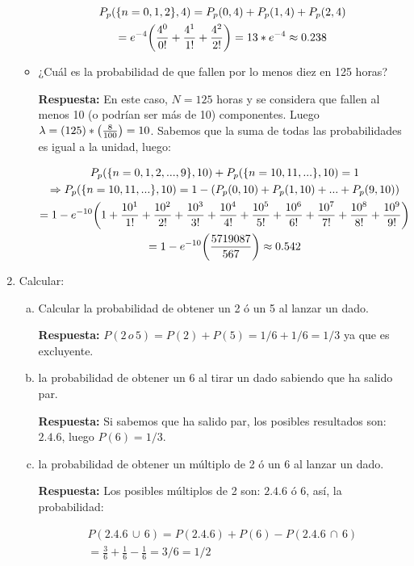 \documentclass[12pt]{article}
\newcommand{\up}[1]{^{#1}}
\begin{document}
\begin{enumerate}
\begin{itemize}
         \begin{gather}
             P_p(\qty{n=0,1,2}, 4) = P_p(0, 4)+P_p(1, 4)+P_p(2, 4)\\
             = e\up{-4}\qty(\frac{4\up{0}}{0!}+\frac{4\up{1}}{1!}+\frac{4\up{2}}{2!}) = 13*e\up{-4} \approx 0.238
         \end{gather}
         
        \item ¿Cuál es la probabilidad de que fallen por lo menos diez en 125 horas? 
        
        \textbf{Respuesta:} En este caso, $N=125$ horas y se considera que fallen al menos 10 (o podrían ser más de 10) componentes. Luego $\lambda = (125)*\qty(\frac{8}{100})=10$. Sabemos que la suma de todas las probabilidades es igual a la unidad, luego:
        
        \begin{gather}
            P_p(\qty{n=0,1,2,...,9}, 10) + P_p(\qty{n=10,11,...},10) = 1\\
            \Rightarrow P_p(\qty{n=10,11,...},10) = 1 - \qty(P_p(0,10)+P_p(1,10)+...+P_p(9,10))\\
            = 1-e\up{-10}\qty(1+\frac{10\up{1}}{1!}+\frac{10\up{2}}{2!}+\frac{10\up{3}}{3!}+\frac{10\up{4}}{4!}+\frac{10\up{5}}{5!}+\frac{10\up{6}}{6!}+\frac{10\up{7}}{7!}+\frac{10\up{8}}{8!}+\frac{10\up{9}}{9!})\\
            = 1 - e\up{-10}\qty(\frac{5719087}{567}) \approx 0.542
        \end{gather}
    \end{itemize}
    
    \item Calcular:
    \begin{enumerate}[(a)]
        \item Calcular la probabilidad de obtener un 2 ó un 5 al lanzar un dado.
        
        \textbf{Respuesta:} $P(2 \,o\, 5) = P(2) + P(5) = 1/6 +1/6 = 1/3$ ya que es excluyente.
        
        \item la probabilidad de obtener un 6 al tirar un dado sabiendo que ha salido par.  
        
        \textbf{Respuesta:} Si sabemos que ha salido par, los posibles resultados son: $\qty{2,4,6}$, luego $P(6) = 1/3$.
        
        \item  la probabilidad de obtener un múltiplo de 2 ó un 6 al lanzar un dado. 
        
         \textbf{Respuesta:} Los posibles múltiplos de 2 son: $\qty{2,4,6}$ ó $\qty{6}$, así, la probabilidad:
         
        \begin{gather}
        P(\qty{2,4,6}\,\cup\,\qty{6}) = P(\qty{2,4,6}) + P(6) - P(\qty{2,4,6}\,\cap\,\qty{6})\\
        = \frac{3}{6} + \frac{1}{6} - \frac{1}{6} = 3/6 = 1/2
        \end{gather}
    \end{enumerate}
\end{enumerate}
\end{document}
